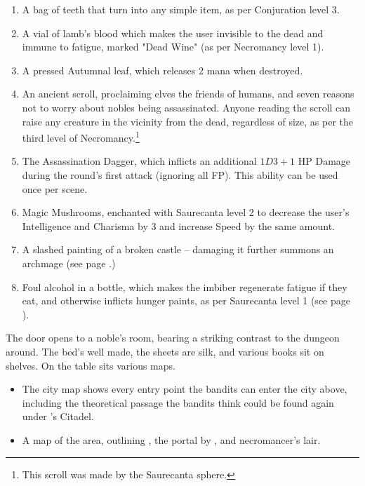 \begin{multicols}{2}
\begin{enumerate}
	\item{A bag of teeth that turn into any simple item, as per Conjuration level 3.}
	\item{A vial of lamb's blood which makes the user invisible to the dead and immune to fatigue, marked "Dead Wine" (as per Necromancy level 1).}
	\item{A pressed Autumnal leaf, which releases 2 mana when destroyed.}
	\item{An ancient scroll, proclaiming elves the friends of humans, and seven reasons not to worry about nobles being assassinated.  Anyone reading the scroll can raise any creature in the vicinity from the dead, regardless of size, as per the third level of Necromancy.\footnote{This scroll was made by the Saurecanta sphere.}}
	\item{The Assassination Dagger, which inflicts an additional $1D3+1$ HP Damage during the round's first attack (ignoring all FP).  This ability can be used once per scene.}
	\item{Magic Mushrooms, enchanted with Saurecanta level 2 to decrease the user's Intelligence and Charisma by 3 and increase Speed by the same amount.}
	\item{A slashed painting of a broken castle -- damaging it further summons an archmage (see page \pageref{archmage}.)}
	\item{Foul alcohol in a bottle, which makes the imbiber regenerate fatigue if they eat, and otherwise inflicts hunger paints, as per Saurecanta level 1 (see page \pageref{saurecantaone}).}
\end{enumerate}


\begin{boxtext}
	The door opens to a noble's room, bearing a striking contrast to the dungeon around.  The bed's well made, the sheets are silk, and various books sit on shelves.  On the table sits various maps.
\end{boxtext}

\begin{itemize}

	\item{The city map shows every entry point the bandits can enter the city above, including the theoretical passage the bandits think could be found again under 's Citadel.}

	\item{A map of the area, outlining , the portal by , and \gls{necromancer}'s lair.}


\end{itemize}
\end{multicols}
